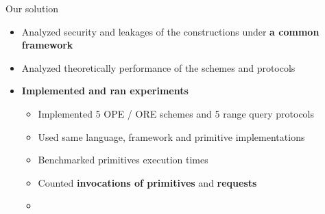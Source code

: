 \begin{frame}[label={frame:ore}]
\begin{columns}[T,onlytextwidth]
{\begin{block}{Our solution}
						\begin{itemize}[leftmargin=*]
							\item Analyzed security and leakages of the constructions under \textbf{a common framework}
							\item Analyzed theoretically performance of the schemes and protocols
							\item \textbf{Implemented and ran experiments}
							\begin{itemize}[leftmargin=*]
								\item Implemented 5 OPE / ORE schemes and 5 range query protocols
								\item Used same language, framework and primitive implementations
								\item Benchmarked primitives execution times
								\item Counted \textbf{invocations of primitives} and \textbf{\IO{} requests}
								\item[]
									\hyperlink{frame:appendix:ore}{}
									\hyperlink{frame:appendix:protocols}{}
									\hyperlink{frame:appendix:plot}{}
							\end{itemize}
						\end{itemize}

					\end{block}
				}

		\end{columns}

	\end{frame}
